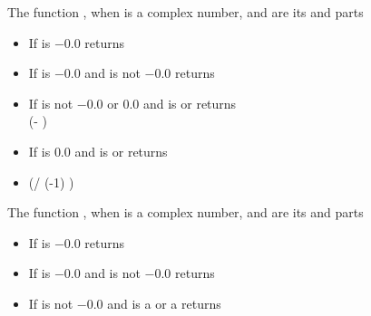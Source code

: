 \documentclass[../Exponentials-Logarithms-Trigonometry.tex]{subfiles}
\begin{document}
\noindent
The function , when  is a complex number, 
and  are its  and  parts
\begin{itemize}
\item If  is $-0.0$ returns 
\item If  is $-0.0$ and  is not
  $-0.0$ returns \code{)))}
\item If  is not $-0.0$ or $0.0$ and
   is  or  returns\\
   \code{)} (- )\code{))}
\item If  is $0.0$ and  is
   or  returns
\item {}(/ (-1) )\code{)}
\end{itemize}

\noindent
The function , when  is a complex number, 
and  are its  and  parts
\begin{itemize}
\item If  is $-0.0$ returns 
\item If  is $-0.0$ and  is not
  $-0.0$ returns \code{))))}
\item If  is not $-0.0$ and  is a
   or a  returns\\
  \code{))}
\end{itemize}

\DExceptional{}
\end{document}
